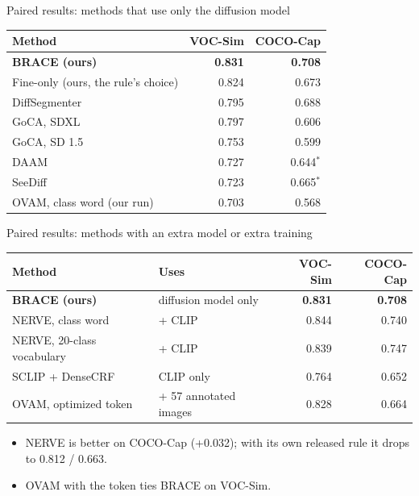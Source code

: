 \documentclass[aspectratio=169,11pt]{beamer}
\begin{document}
\begin{frame}{Paired results: methods that use only the diffusion model}
\begin{slidetable}
\begin{tabular}{@{}lrr@{}}
\toprule
Method & VOC-Sim & COCO-Cap \\
\midrule
\textbf{BRACE (ours)} & \textbf{0.831} & \textbf{0.708} \\
Fine-only (ours, the rule's choice) & 0.824 & 0.673 \\
DiffSegmenter & 0.795 & 0.688 \\
GoCA, SDXL & 0.797 & 0.606 \\
GoCA, SD 1.5 & 0.753 & 0.599 \\
DAAM & 0.727 & 0.644$^*$ \\
SeeDiff & 0.723 & 0.665$^*$ \\
OVAM, class word (our run) & 0.703 & 0.568 \\
\bottomrule
\end{tabular}
\end{slidetable}
\end{frame}

\begin{frame}{Paired results: methods with an extra model or extra training}
\begin{slidetable}
\begin{tabular}{@{}llrr@{}}
\toprule
Method & Uses & VOC-Sim & COCO-Cap \\
\midrule
\textbf{BRACE (ours)} & diffusion model only & \textbf{0.831} & \textbf{0.708} \\
NERVE, class word & + CLIP & 0.844 & 0.740 \\
NERVE, 20-class vocabulary & + CLIP & 0.839 & 0.747 \\
SCLIP + DenseCRF & CLIP only & 0.764 & 0.652 \\
OVAM, optimized token & + 57 annotated images & 0.828 & 0.664 \\
\bottomrule
\end{tabular}
\end{slidetable}
\begin{itemize}
\item NERVE is better on COCO-Cap (+0.032); with its own released rule it drops to 0.812 / 0.663.
\item OVAM with the token ties BRACE on VOC-Sim.
\end{itemize}
\end{frame}
\end{document}
